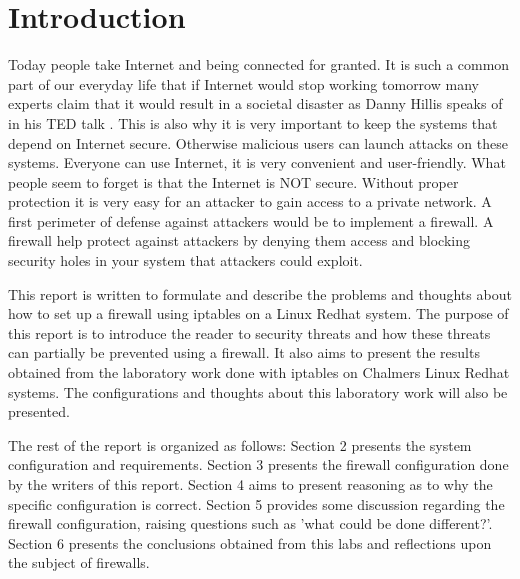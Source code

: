 \section{Introduction} 
\label{sec:intro}
Today people take Internet and being connected for granted. It is such a common part of our everyday life that if Internet would stop working tomorrow many experts claim that it would result in a societal disaster as Danny Hillis speaks of in his TED talk \cite{hillis13}. This is also why it is very important to keep the systems that depend on Internet secure. Otherwise malicious users can launch attacks on these systems. Everyone can use Internet, it is very convenient and user-friendly. What people seem to forget is that the Internet is NOT secure. Without proper protection it is very easy for an attacker to gain access to a private network. A first perimeter of defense against attackers would be to implement a firewall. A firewall help protect against attackers by denying them access and blocking security holes in your system that attackers could exploit.

This report is written to formulate and describe the problems and thoughts about how to set up a firewall using iptables on a Linux Redhat system. The purpose of this report is to introduce the reader to security threats and how these threats can partially be prevented using a firewall. It also aims to present the results obtained from the laboratory work done with iptables on Chalmers Linux Redhat systems. The configurations and thoughts about this laboratory work will also be presented.

The rest of the report is organized as follows: Section 2 presents the system configuration and requirements. Section 3 presents the firewall configuration done by the writers of this report. Section 4 aims to present reasoning as to why the specific configuration is correct. Section 5 provides some discussion regarding the firewall configuration, raising questions such as 'what could be done different?'. Section 6 presents the conclusions obtained from this labs and reflections upon the subject of firewalls.



